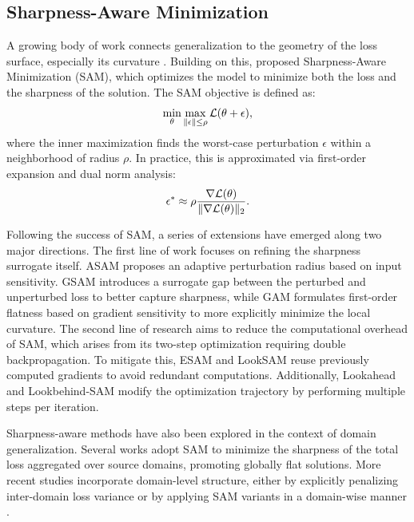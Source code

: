\documentclass{article}
\theoremstyle{plain}
\theoremstyle{definition}
\theoremstyle{remark}
\begin{document}
\subsection{Sharpness-Aware Minimization}


A growing body of work connects generalization to the geometry of the loss surface, especially its curvature \citep{hochreiter1994simplifying, neyshabur2017exploring, keskar2017on, chaudhari2019entropy, foret2021sam}. Building on this, \citet{foret2021sam} proposed Sharpness-Aware Minimization (SAM), which optimizes the model to minimize both the loss and the sharpness of the solution. The SAM objective is defined as:
\begin{equation}\label{eq:sam_objective}
    \min_{\theta} \max_{\|\epsilon\| \leq \rho} {\mathcal{L}}(\theta + \epsilon),
\end{equation}
where the inner maximization finds the worst-case perturbation \( \epsilon \) within a neighborhood of radius \( \rho \). In practice, this is approximated via first-order expansion and dual norm analysis:
\begin{align*}
    \epsilon^* \approx \rho \frac{\nabla {\mathcal{L}}(\theta)}{\|\nabla {\mathcal{L}}(\theta)\|_2}.
\end{align*}




Following the success of SAM, a series of extensions have emerged along two major directions. The first line of work focuses on refining the sharpness surrogate itself. ASAM \citep{kwon2021asam} proposes an adaptive perturbation radius based on input sensitivity. GSAM \citep{zhuang2022gsam} introduces a surrogate gap between the perturbed and unperturbed loss to better capture sharpness, while GAM \citep{zhang2023gam} formulates first-order flatness based on gradient sensitivity to more explicitly minimize the local curvature. The second line of research aims to reduce the computational overhead of SAM, which arises from its two-step optimization requiring double backpropagation. To mitigate this, ESAM and LookSAM \citep{du2022esam, liu2022looksam} reuse previously computed gradients to avoid redundant computations. Additionally, Lookahead and Lookbehind-SAM \citep{zhang2019lookahead, mordido2024lookbehind} modify the optimization trajectory by performing multiple steps per iteration. 


Sharpness-aware methods have also been explored in the context of domain generalization. Several works \citep{wang2023sagm, shin2024udim, cha2021swad} adopt SAM to minimize the sharpness of the total loss aggregated over source domains, promoting globally flat solutions. More recent studies incorporate domain-level structure, either by explicitly penalizing inter-domain loss variance \citep{zhang2024disam} or by applying SAM variants in a domain-wise manner \citep{le2024gacfas}.
\end{document}
